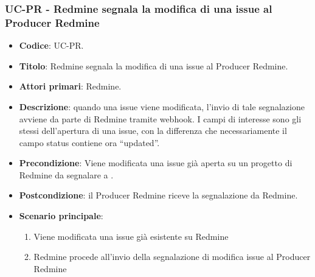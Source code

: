 	\subsubsection{UC\theuccount-PR - Redmine segnala la modifica di una issue al Producer Redmine}
	\begin{itemize}
		\item \textbf{Codice}: UC\theuccount-PR.
		\item \textbf{Titolo}: Redmine segnala la modifica di una issue al Producer Redmine.
		\item \textbf{Attori primari}: Redmine.
		\item \textbf{Descrizione}: quando una issue viene modificata, l'invio di tale segnalazione
		avviene da parte di Redmine tramite webhook.
		I campi di interesse sono gli stessi dell'apertura di una issue, con la differenza che necessariamente il campo status contiene ora ``updated''.
		\item \textbf{Precondizione}: Viene modificata una issue già aperta su un
		progetto di Redmine da segnalare a \progetto.
		\item \textbf{Postcondizione}: il Producer Redmine riceve la segnalazione da Redmine.
		\item \textbf{Scenario principale}: 
		\begin{enumerate}
			\item Viene modificata una issue già esistente su Redmine
			\item Redmine procede all'invio della segnalazione di modifica issue al Producer Redmine
		\end{enumerate}
		
	\end{itemize}